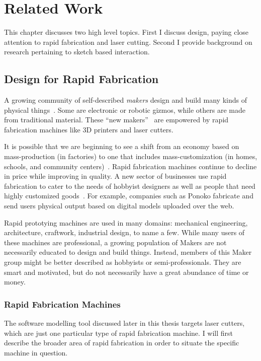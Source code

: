 \chapter{Related Work}

This chapter discusses two high level topics. First I discuss design,
paying close attention to rapid fabrication and laser cutting. Second
I provide background on research pertaining to sketch based interaction.

\section{Design for Rapid Fabrication}

A growing community of self-described \textit{makers} design and build
many kinds of physical things~\cite{gershenfeld-fab}. Some are
electronic or robotic gizmos, while others are made from traditional
material. These ``new makers''~\cite{gross-new-makers} are empowered
by rapid fabrication machines like 3D printers and laser cutters.

It is possible that we are beginning to see a shift from an economy
based on mass-production (in factories) to one that includes
mass-customization (in homes, schools, and community
centers)~\cite{economist-fab}. Rapid fabrication machines continue to
decline in price while improving in quality. A new sector of
businesses use rapid fabrication to cater to the needs of hobbyist
designers as well as people that need highly customized
goods~\cite{paulos-citizenscience}. For example, companies such as
Ponoko fabricate and send users physical output based on digital
models uploaded over the web.

Rapid prototying machines are used in many domains: mechanical
engineering, architecture, craftwork, industrial design, to name a
few. While many users of these machines are professional, a growing
population of Makers are not necessarily educated to design and build
things. Instead, members of this Maker group might be better described
as hobbyists or semi-professionals. They are smart and motivated, but
do not necessarily have a great abundance of time or money.

\subsection{Rapid Fabrication Machines}

The software modelling tool discussed later in this thesis targets
laser cutters, which are just one particular type of rapid fabrication
machine. I will first describe the broader area of rapid fabrication
in order to situate the specific machine in question.

